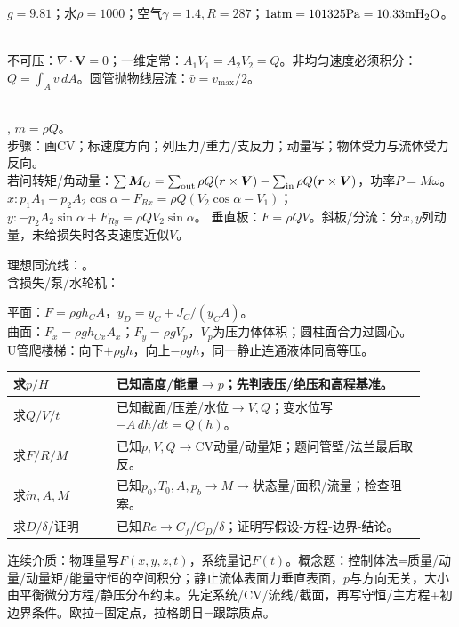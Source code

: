 $g=9.81$；水$\rho=1000$；空气$\gamma=1.4,R=287$；$1\rm atm=101325Pa=10.33mH_2O$。\\
\\

不可压：$\nabla\cdot\bm V=0$；一维定常：$A_1V_1=A_2V_2=Q$。非均匀速度必须积分：$Q=\int_A v\,dA$。圆管抛物线层流：$\bar v=v_{\max}/2$。

\\
, $\dot m=\rho Q$。\\
步骤：画CV；标速度方向；列压力/重力/支反力；动量写；物体受力与流体受力反向。\\
若问转矩/角动量：$\sum \bm M_O=\sum_{\rm out}\rho Q(\bm r\times\bm V)-\sum_{\rm in}\rho Q(\bm r\times\bm V)$，功率$P=M\omega$。\\
$x:p_1A_1-p_2A_2\cos\alpha-F_{Rx}=\rho Q(V_2\cos\alpha-V_1)$；\\
$y:-p_2A_2\sin\alpha+F_{Ry}=\rho QV_2\sin\alpha$。
垂直板：$F=\rho QV$。斜板/分流：分$x,y$列动量，未给损失时各支速度近似$V$。

理想同流线：。\\
含损失/泵/水轮机：\\

平面：$F=\rho gh_CA$，$y_D=y_C+J_C/(y_CA)$。\\
曲面：$F_x=\rho gh_{Cx}A_x$；$F_y=\rho gV_p$，$V_p$为压力体体积；圆柱面合力过圆心。\\
U管爬楼梯：向下$+\rho gh$，向上$-\rho gh$，同一静止连通液体同高等压。
\renewcommand{\arraystretch}{0.70}\begin{tabular}{|p{0.23\linewidth}|p{0.69\linewidth}|}
\hline 求$p/H$ & 已知高度/能量$\to p$；先判表压/绝压和高程基准。\\ \hline
求$Q/V/t$ & 已知截面/压差/水位$\to V,Q$；变水位写$-A\,dh/dt=Q(h)$。\\ \hline
求$F/R/M$ & 已知$p,V,Q\to$CV动量/动量矩；题问管壁/法兰最后取反。\\ \hline
求$\dot m,A,M$ & 已知$p_0,T_0,A,p_b\to M\to$状态量/面积/流量；检查阻塞。\\ \hline
求$D/\delta$/证明 & 已知$Re\to C_f/C_D/\delta$；证明写假设-方程-边界-结论。\\ \hline
\end{tabular}\renewcommand{\arraystretch}{1}
连续介质：物理量写$F(x,y,z,t)$，系统量记$F(t)$。概念题：控制体法=质量/动量/动量矩/能量守恒的空间积分；静止流体表面力垂直表面，$p$与方向无关，大小由平衡微分方程/静压分布约束。先定系统/CV/流线/截面，再写守恒/主方程+初边界条件。欧拉=固定点，拉格朗日=跟踪质点。

